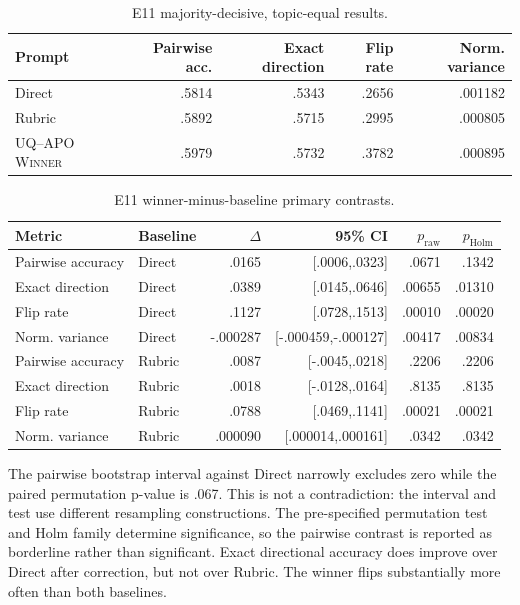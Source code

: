 \documentclass[11pt,twoside,a4paper]{report}
\newcommand{\winner}{\textsc{UQ--APO Winner}}
\newcommand{\rawp}{\ensuremath{p_{\mathrm{raw}}}}
\newcommand{\holmp}{\ensuremath{p_{\mathrm{Holm}}}}
\begin{document}
\begin{table}[htbp]
\centering
\caption{E11 majority-decisive, topic-equal results.}
\label{tab:e11-summary}
\begin{tabular}{lrrrr}
\toprule
Prompt & Pairwise acc. & Exact direction & Flip rate & Norm. variance \\
\midrule
Direct & .5814 & .5343 & .2656 & .001182 \\
Rubric & .5892 & .5715 & .2995 & .000805 \\
\winner & .5979 & .5732 & .3782 & .000895 \\
\bottomrule
\end{tabular}
\end{table}

\begin{table}[htbp]
\centering
\caption{E11 winner-minus-baseline primary contrasts.}
\label{tab:e11-tests}
\begin{tabularx}{\textwidth}{llrrrr}
\toprule
Metric & Baseline & $\Delta$ & 95\% CI & \rawp{} & \holmp{} \\
\midrule
Pairwise accuracy & Direct & .0165 & [.0006,.0323] & .0671 & .1342 \\
Exact direction & Direct & .0389 & [.0145,.0646] & .00655 & .01310 \\
Flip rate & Direct & .1127 & [.0728,.1513] & .00010 & .00020 \\
Norm. variance & Direct & -.000287 & [-.000459,-.000127] & .00417 & .00834 \\
\addlinespace
Pairwise accuracy & Rubric & .0087 & [-.0045,.0218] & .2206 & .2206 \\
Exact direction & Rubric & .0018 & [-.0128,.0164] & .8135 & .8135 \\
Flip rate & Rubric & .0788 & [.0469,.1141] & .00021 & .00021 \\
Norm. variance & Rubric & .000090 & [.000014,.000161] & .0342 & .0342 \\
\bottomrule
\end{tabularx}
\end{table}

The pairwise bootstrap interval against Direct narrowly excludes zero while the
paired permutation p-value is .067.  This is not a contradiction: the interval and
test use different resampling constructions.  The pre-specified permutation test and
Holm family determine significance, so the pairwise contrast is reported as
borderline rather than significant.  Exact directional accuracy does improve over
Direct after correction, but not over Rubric.  The winner flips substantially more
often than both baselines.
\end{document}
